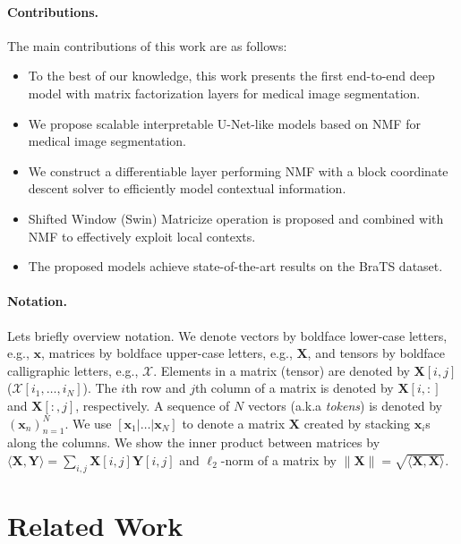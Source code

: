 \documentclass[a4,12pt]{article}
\begin{document}
	
	\paragraph{Contributions.}
	The main contributions of this work are as follows:
	\begin{itemize}
		\item To the best of our knowledge, this work presents the first end-to-end deep model with matrix factorization layers for medical image segmentation.
		\item We propose scalable interpretable U-Net-like models based on NMF for medical image segmentation. 
		\item We construct a differentiable layer performing NMF with a block coordinate descent solver to efficiently model contextual information. 
		\item Shifted Window (Swin) Matricize operation is proposed and combined with NMF to effectively exploit local contexts.
		\item The proposed models achieve state-of-the-art results on the BraTS dataset.
	\end{itemize}
	
	
	\paragraph{Notation.} Lets briefly overview notation. We denote vectors by boldface lower-case letters, e.g., $ \mathbf{x} $, matrices by boldface upper-case letters, e.g., $ \mathbf{X} $, and tensors by boldface calligraphic letters, e.g., $ \bm{\mathcal{X}} $. Elements in
	a matrix (tensor) are denoted by $ \mathbf{X}[i,j] $ ($ \bm{\mathcal{X}}[i_1, \dots, i_N] $). The $ i $th row and $ j $th column of a matrix is denoted by $ \mathbf{X}[i,:] $ and $ \mathbf{X}[:,j] $, respectively. A sequence of $ N $ vectors (a.k.a \textit{tokens}) is denoted by $ (\mathbf{x}_n)_{n=1}^{N} $. We use $ [\mathbf{x}_1|\dots|\mathbf{x}_N] $ to denote a matrix $ \mathbf{X} $ created by stacking $ \mathbf{x}_i $s along the columns. We show the inner product between matrices by $ \langle \mathbf{X}, \mathbf{Y} \rangle = \sum_{i,j} \mathbf{X}[i,j] \mathbf{Y}[i,j] $ and $ \ell _{2} $-norm of a matrix by $ \| \mathbf{X} \| = \sqrt{\langle \mathbf{X}, \mathbf{X}  \rangle} $.
	
	
	
	
	
	
	\section{Related Work} \label{sec: background}
\end{document}
